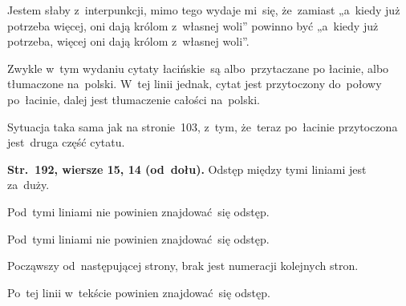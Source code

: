 \documentclass[a4paper,11pt]{article}
\numberwithin{equation}{section}
\begin{document}
\VerSpaceFour





\noindent
{} Jestem słaby z~interpunkcji, mimo tego wydaje
mi~się, że~zamiast „a~kiedy już potrzeba więcej, oni dają królom
z~własnej woli” powinno być „a~kiedy już potrzeba, więcej oni dają
królom z~własnej woli”.

\VerSpaceFour





\noindent
{} Zwykle w~tym wydaniu cytaty łacińskie~są
albo~przytaczane po łacinie, albo tłumaczone na~polski. W~tej linii jednak,
cytat jest przytoczony do~połowy po~łacinie, dalej jest tłumaczenie całości
na~polski.

\VerSpaceFour





\noindent
{} Sytuacja taka sama jak na stronie~103, z~tym,
że~teraz po~łacinie przytoczona jest~druga część cytatu.

\VerSpaceFour





\noindent
\textbf{Str.~192, wiersze 15, 14 (od~dołu).} Odstęp między tymi
liniami jest za~duży.

\VerSpaceFour





\noindent
{} Pod~tymi liniami nie powinien znajdować~się
odstęp.

\VerSpaceFour





\noindent
{} Pod~tymi liniami nie powinien znajdować~się
odstęp.

\VerSpaceFour





\noindent
{} Począwszy od~następującej strony, brak jest numeracji kolejnych
stron.

\VerSpaceFour





\noindent
{} Po~tej linii w~tekście powinien znajdować~się
odstęp.

\VerSpaceFour
\end{document}

